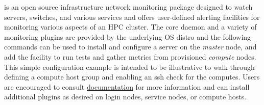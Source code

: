 \Nagios{} is an open source infrastructure network monitoring package designed
to watch servers, switches, and various services and offers user-defined
alerting facilities for monitoring various aspects of an HPC
cluster. The core \Nagios{} daemon and a variety of monitoring plugins
are provided by the underlying OS distro and the following commands can
be used to install and configure a \Nagios{} server on the {\em
master} node, and add the facility to run tests and gather metrics
from provisioned {\em compute} nodes. This simple configuration
example is intended to be illustrative to walk through defining a
compute host group and enabling an ssh check for the computes. Users
are encouraged to
consult \Nagios{} \href{https://assets.nagios.com/downloads/nagioscore/docs/nagioscore/4/en/}{\color{blue}
documentation} for more information and can install additional plugins
as desired on login nodes, service nodes, or compute hosts.

